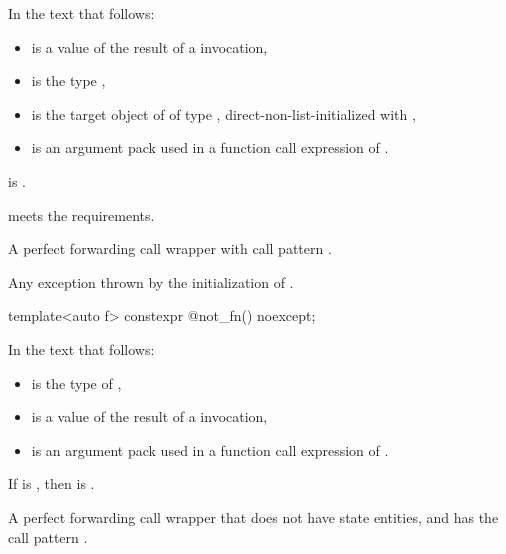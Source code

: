\begin{itemdescr}
\pnum
In the text that follows:
\begin{itemize}
\item {} is a value of the result of a  invocation,
\item {} is the type ,
\item {} is the target object of 
  of type ,
  direct-non-list-initialized with ,
\item {} is an argument pack
  used in a function call expression of .
\end{itemize}

\pnum
\mandates
{}
is .

\pnum
\expects
{} meets the  requirements.

\pnum
\returns
A perfect forwarding call wrapper 
with call pattern .

\pnum
\throws
Any exception thrown by the initialization of .
\end{itemdescr}

%
\begin{itemdecl}
template<auto f> constexpr @\unspec@ not_fn() noexcept;
\end{itemdecl}

\begin{itemdescr}
\pnum
In the text that follows:
\begin{itemize}
\item
{} is the type of ,
\item
{} is a value of the result of a  invocation,
\item
{} is an argument pack
used in a function call expression of .
\end{itemize}

\pnum
\mandates
If  is ,
then  is .

\pnum
\returns
A perfect forwarding call wrapper  that
does not have state entities, and
has the call pattern .
\end{itemdescr}

